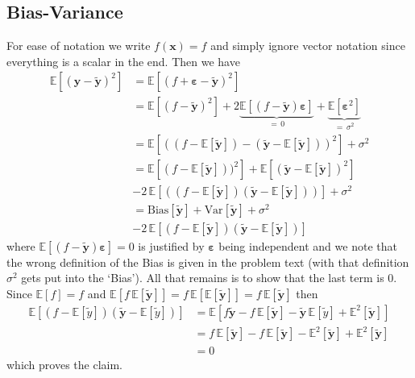 \documentclass[%
reprint,
amsmath,amssymb,
aps,
pra,
]{revtex4-2}
\begin{document}
\subsection{Bias-Variance}
For ease of notation we write $f(\bm x)=f$ and simply ignore vector notation since everything is a scalar in the end. Then we have
\begin{align*}
	\mathbb{E}[(\bm y-\tilde{\bm y})^2]&=\mathbb{E}[(f+\bm\varepsilon-\tilde{\bm y})^2]\\
	&=\mathbb{E}[(f-\tilde{\bm y})^2]+2\underbrace{\mathbb{E}[(f-\tilde{\bm y})\bm\varepsilon]}_{=\,0}+\underbrace{\mathbb{E}[\bm\varepsilon^2]}_{=\,\sigma^2}\\
	&=\mathbb{E}[((f-\mathbb{E}[\tilde{\bm y}])-(\tilde{\bm y}-\mathbb{E}[\tilde{\bm y}]))^2]+\sigma^2\\
	&=\mathbb{E}[(f-\mathbb{E}[\tilde{\bm y}]))^2]+\mathbb{E}[(\tilde{\bm y}-\mathbb{E}[\tilde{\bm y}])^2]\\
	&-2\,\mathbb{E}[((f-\mathbb{E}[\tilde{\bm y}])(\tilde{\bm y}-\mathbb{E}[\tilde{\bm y}]))]+\sigma^2\\
	&=\text{Bias}[\tilde{\bm y}]+\text{Var}[\tilde{\bm y}]+\sigma^2\\
	&-2\,\mathbb{E}[(f-\mathbb{E}[\tilde{\bm y}])(\tilde{\bm y}-\mathbb{E}[\tilde{\bm y}])]
\end{align*}
where $\mathbb{E}[(f-\tilde{\bm y})\bm\varepsilon]=0$ is justified by $\bm\varepsilon$ being independent and we note that the wrong definition of the Bias is given in the problem text (with that definition $\sigma^2$ gets put into the `Bias'). All that remains is to show that the last term is 0. Since $\mathbb{E}[f]=f$ and $\mathbb{E}[f\,\mathbb{E}[\tilde{\bm y}]]=f\,\mathbb{E}[\mathbb{E}[\tilde{\bm y}]]=f\,\mathbb{E}[\tilde{\bm y}]$ then
\begin{align*}
	\mathbb{E}[(f-\mathbb{E}[\tilde y])(\tilde{\bm y}-\mathbb{E}[\tilde y])]&=\mathbb{E}[f\tilde{\bm y}-f\,\mathbb{E}[\tilde{\bm y}]-\tilde{\bm y}\,\mathbb{E}[\tilde y]+\mathbb{E}^2[\tilde{\bm y}]]\\
	&=f\,\mathbb{E}[\tilde{\bm y}]-f\,\mathbb{E}[\tilde{\bm y}]-\mathbb{E}^2[\tilde{\bm y}]+\mathbb{E}^2[\tilde{\bm y}]\\
	&=0
\end{align*}
which proves the claim. 

\section{}
	
\end{document}
